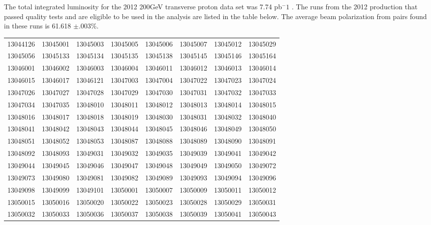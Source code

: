 \documentclass[letterpaper, abstract = on,listof=totoc, bibliography=totoc]{scrreprt}
\begin{document}
The total integrated luminosity for the 2012 200GeV transverse proton data set was 7.74 pb$^-1$ \cite{BeamUse}. The runs from the 2012 production that passed quality tests and are eligible to be used in the analysis are listed in the table below. The average beam polarization from pairs found in these runs is 61.618 $\pm .003 \%$.
\tiny{
\begin{longtable}{cccccccc} \hline
13044126  &  13045001  &  13045003  &  13045005  &  13045006  &  13045007  &  13045012  &  13045029  \\ 
13045056  &  13045133  &  13045134  &  13045135  &  13045138  &  13045145  &  13045146  &  13045164  \\ 
13046001  &  13046002  &  13046003  &  13046004  &  13046011  &  13046012  &  13046013  &  13046014  \\ 
13046015  &  13046017  &  13046121  &  13047003  &  13047004  &  13047022  &  13047023  &  13047024  \\ 
13047026  &  13047027  &  13047028  &  13047029  &  13047030  &  13047031  &  13047032  &  13047033  \\ 
13047034  &  13047035  &  13048010  &  13048011  &  13048012  &  13048013  &  13048014  &  13048015  \\ 
13048016  &  13048017  &  13048018  &  13048019  &  13048030  &  13048031  &  13048032  &  13048040  \\ 
13048041  &  13048042  &  13048043  &  13048044  &  13048045  &  13048046  &  13048049  &  13048050  \\ 
13048051  &  13048052  &  13048053  &  13048087  &  13048088  &  13048089  &  13048090  &  13048091  \\ 
13048092  &  13048093  &  13049031  &  13049032  &  13049035  &  13049039  &  13049041  &  13049042  \\ 
13049044  &  13049045  &  13049046  &  13049047  &  13049048  &  13049049  &  13049050  &  13049072  \\ 
13049073  &  13049080  &  13049081  &  13049082  &  13049089  &  13049093  &  13049094  &  13049096  \\ 
13049098  &  13049099  &  13049101  &  13050001  &  13050007  &  13050009  &  13050011  &  13050012  \\ 
13050015  &  13050016  &  13050020  &  13050022  &  13050023  &  13050028  &  13050029  &  13050031  \\ 
13050032  &  13050033  &  13050036  &  13050037  &  13050038  &  13050039  &  13050041  &  13050043  \\ 

\end{longtable}}
\end{document}
